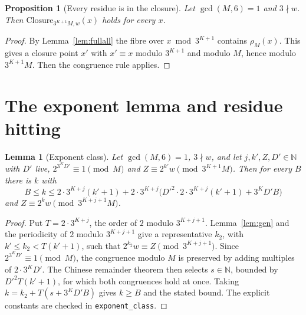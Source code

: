 \documentclass[11pt,reqno,oneside]{amsart}
\theoremstyle{plain}
\newtheorem{proposition}[theorem]{Proposition}
\newtheorem{lemma}[theorem]{Lemma}
\theoremstyle{definition}
\numberwithin{equation}{section}
\newcommand{\lean}[1]{\texttt{#1}}
\begin{document}
\begin{proposition}[Every residue is in the closure]\label{prop:closureall}
Let $\gcd(M,6)=1$ and $3\nmid w$. Then $\mathrm{Closure}_{3^{K+1}M,w}(x)$ holds for every $x$.
\end{proposition}
\begin{proof}
By Lemma~\ref{lem:fullall} the fibre over $x\bmod3^{K+1}$ contains $\rho_M(x)$. This gives a closure point $x'$ with $x'\equiv x$ modulo $3^{K+1}$ and modulo $M$, hence modulo $3^{K+1}M$. Then the congruence rule applies.
\end{proof}

\section{The exponent lemma and residue hitting}\label{sec:hitting}

\begin{lemma}[Exponent class]\label{lem:exponent}
Let $\gcd(M,6)=1$, $3\nmid w$, and let $j,k',Z,D'\in\mathbb N$ with $D'$ live, $2^{3^KD'}\equiv1\pmod M$ and $Z\equiv2^{k'}w\pmod{3^{K+1}M}$. Then for every $B$ there is $k$ with
\[
B\le k\le 2\cdot3^{K+j}(k'+1)+2\cdot3^{K+j}\bigl(D'^2\cdot2\cdot3^{K+j}(k'+1)+3^KD'B\bigr)
\]
and $Z\equiv2^kw\pmod{3^{K+j+1}M}$.
\end{lemma}
\begin{proof}
Put $T=2\cdot3^{K+j}$, the order of $2$ modulo $3^{K+j+1}$. Lemma~\ref{lem:gen} and the periodicity of $2$ modulo $3^{K+j+1}$ give a representative $k_2$, with $k'\le k_2<T(k'+1)$, such that $2^{k_2}w\equiv Z\pmod{3^{K+j+1}}$. Since $2^{3^KD'}\equiv1\pmod M$, the congruence modulo $M$ is preserved by adding multiples of $2\cdot3^KD'$. The Chinese remainder theorem then selects $s\in\mathbb N$, bounded by $D'^2T(k'+1)$, for which both congruences hold at once. Taking $k=k_2+T(s+3^KD'B)$ gives $k\ge B$ and the stated bound. The explicit constants are checked in \lean{exponent\_class}.
\end{proof}
\end{document}
